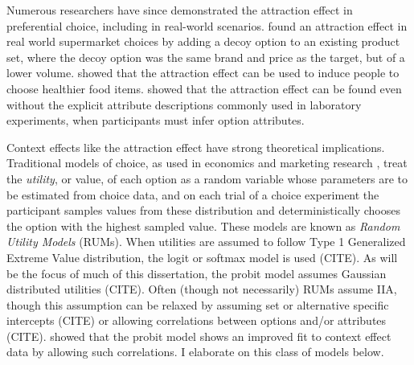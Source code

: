 Numerous researchers have since demonstrated the attraction effect in preferential choice, including in real-world scenarios. \textcite{doyleRobustnessAsymmetricallyDominated1999} found an attraction effect in real world supermarket choices by adding a decoy option to an existing product set, where the decoy option was the same brand and price as the target, but of a lower volume. \textcite{van2021attract} showed that the attraction effect can be used to induce people to choose healthier food items. \textcite{slaughterDecoyEffectsAttributelevel1999b} showed that the attraction effect can be found even without the explicit attribute descriptions commonly used in laboratory experiments, when participants must infer option attributes. 

Context effects like the attraction effect have strong theoretical implications. Traditional models of choice, as used in economics and marketing research \parencite{mcfadden2001economic}, treat the \textit{utility}, or value, of each option as a random variable whose parameters are to be estimated from choice data, and on each trial of a choice experiment the participant samples values from these distribution and deterministically chooses the option with the highest sampled value. These models are known as \textit{Random Utility Models} (RUMs). When utilities are assumed to follow Type 1 Generalized Extreme Value distribution, the logit or softmax model is used (CITE). As will be the focus of much of this dissertation, the probit model assumes Gaussian distributed utilities (CITE). Often (though not necessarily) RUMs assume IIA, though this assumption can be relaxed by assuming set or alternative specific intercepts (CITE) or allowing correlations between options and/or attributes (CITE). \textcite{haaijer1998utility} showed that the probit model shows an improved fit to context effect data by allowing such correlations. I elaborate on this class of models below. 

